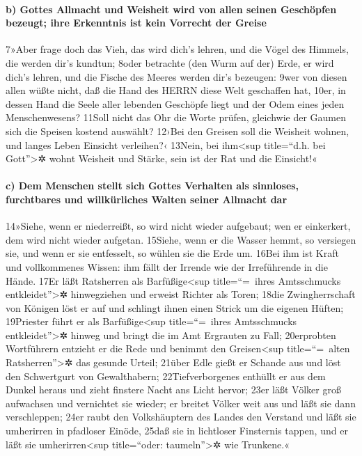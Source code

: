 \hypertarget{b-gottes-allmacht-und-weisheit-wird-von-allen-seinen-geschuxf6pfen-bezeugt-ihre-erkenntnis-ist-kein-vorrecht-der-greise}{%
\paragraph{b) Gottes Allmacht und Weisheit wird von allen seinen
Geschöpfen bezeugt; ihre Erkenntnis ist kein Vorrecht der
Greise}\label{b-gottes-allmacht-und-weisheit-wird-von-allen-seinen-geschuxf6pfen-bezeugt-ihre-erkenntnis-ist-kein-vorrecht-der-greise}}

7»Aber frage doch das Vieh, das wird dich's lehren, und die Vögel des
Himmels, die werden dir's kundtun; 8oder betrachte (den Wurm auf der)
Erde, er wird dich's lehren, und die Fische des Meeres werden dir's
bezeugen: 9wer von diesen allen wüßte nicht, daß die Hand des HERRN
diese Welt geschaffen hat, 10er, in dessen Hand die Seele aller lebenden
Geschöpfe liegt und der Odem eines jeden Menschenwesens? 11Soll nicht
das Ohr die Worte prüfen, gleichwie der Gaumen sich die Speisen kostend
auswählt? 12›Bei den Greisen soll die Weisheit wohnen, und langes Leben
Einsicht verleihen?‹ 13Nein, bei ihm\textless sup title=``d.h. bei
Gott''\textgreater✲ wohnt Weisheit und Stärke, sein ist der Rat und die
Einsicht!«

\hypertarget{c-dem-menschen-stellt-sich-gottes-verhalten-als-sinnloses-furchtbares-und-willkuxfcrliches-walten-seiner-allmacht-dar}{%
\paragraph{c) Dem Menschen stellt sich Gottes Verhalten als sinnloses,
furchtbares und willkürliches Walten seiner Allmacht
dar}\label{c-dem-menschen-stellt-sich-gottes-verhalten-als-sinnloses-furchtbares-und-willkuxfcrliches-walten-seiner-allmacht-dar}}

14»Siehe, wenn er niederreißt, so wird nicht wieder aufgebaut; wen er
einkerkert, dem wird nicht wieder aufgetan. 15Siehe, wenn er die Wasser
hemmt, so versiegen sie, und wenn er sie entfesselt, so wühlen sie die
Erde um. 16Bei ihm ist Kraft und vollkommenes Wissen: ihm fällt der
Irrende wie der Irreführende in die Hände. 17Er läßt Ratsherren als
Barfüßige\textless sup title=``=~ihres Amtsschmucks
entkleidet''\textgreater✲ hinwegziehen und erweist Richter als Toren;
18die Zwingherrschaft von Königen löst er auf und schlingt ihnen einen
Strick um die eigenen Hüften; 19Priester führt er als
Barfüßige\textless sup title=``=~ihres Amtsschmucks
entkleidet''\textgreater✲ hinweg und bringt die im Amt Ergrauten zu
Fall; 20erprobten Wortführern entzieht er die Rede und benimmt den
Greisen\textless sup title=``=~alten Ratsherren''\textgreater✲ das
gesunde Urteil; 21über Edle gießt er Schande aus und löst den
Schwertgurt von Gewalthabern; 22Tiefverborgenes enthüllt er aus dem
Dunkel heraus und zieht finstere Nacht ans Licht hervor; 23er läßt
Völker groß aufwachsen und vernichtet sie wieder; er breitet Völker weit
aus und läßt sie dann verschleppen; 24er raubt den Volkshäuptern des
Landes den Verstand und läßt sie umherirren in pfadloser Einöde, 25daß
sie in lichtloser Finsternis tappen, und er läßt sie
umherirren\textless sup title=``oder: taumeln''\textgreater✲ wie
Trunkene.«

